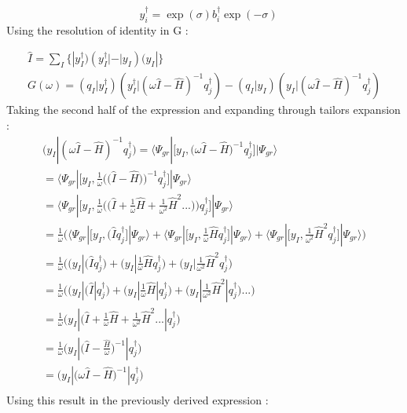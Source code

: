 \documentclass[11pt, oneside]{article}   	%
\begin{document}
\begin{equation*}\label{eq:unitary transformed excitation}
  \begin{aligned}
  \end{aligned}
    y_i^\dagger=\exp(\sigma) b_i^\dagger \exp(- \sigma)
\end{equation*}
Using the resolution of identity in G :

\begin{equation*}\label{eq:resolution of identity}
  \begin{aligned}
    \hat I=\sum_I \{ |y_I^\dagger)(y_I^\dagger|-|y_I)(y_I|\}\\
    G(\omega)=(q_I|y_I^\dagger)(y_I^\dagger|(\omega \hat I - \hat H)^{-1}q_j^\dagger) - (q_I|y_I)(y_I|(\omega \hat I - \hat H)^{-1}q_j^\dagger)
  \end{aligned}
\end{equation*}
Taking the second half of the expression and expanding through tailors expansion :
\begin{equation*}\label{eq:resolution of identity}
  \begin{aligned}
    (y_I|(\omega \hat I - \hat H)^{-1}q_j^\dagger) =\big \langle \Psi_{gr} |\big[ y_I , \big(\omega \hat I-\hat H \big)^{-1} q_j^\dagger \big] | \Psi_{gr}\big \rangle \\ 
     =\big \langle \Psi_{gr} |\big[ y_I , \frac{1}{ \omega} \Bigg( \big( \hat I-\hat H \big)\Bigg)^{-1} q_j^\dagger \big] | \Psi_{gr}\big \rangle \\ 
     =\big \langle \Psi_{gr} |\big[ y_I , \frac{1}{\omega} \Bigg( \big( \hat I+ \frac{1}{ \omega} \hat H + \frac{1}{\omega^2}\hat H^2 ...\big)\Bigg) q_j^\dagger \big] | \Psi_{gr}\big \rangle \\ 
     =\frac{1}{\omega }\Bigg(\big \langle \Psi_{gr} |\big[ y_I , \big( \hat I q_j^\dagger \big] | \Psi_{gr}\big \rangle +\big \langle \Psi_{gr} |\big[ y_I , \frac{1}{\omega}\hat H  q_j^\dagger \big] | \Psi_{gr}\big \rangle  +\big \langle \Psi_{gr} |\big[ y_I ,\frac{1}{\omega^2} \hat H^2  q_j^\dagger \big] | \Psi_{gr}\big \rangle \Bigg)\\ 
     =\frac{1}{\omega} \Bigg(\big( y_I | \big( \hat I q_j^\dagger \big) +\big( y_I | \frac{1}{\omega}\hat H  q_j^\dagger \big) +\big( y_I |\frac{1}{\omega^2} \hat H^2  q_j^\dagger \big)\\ 
     =\frac{1}{\omega} \Bigg(\big( y_I | \big( \hat I| q_j^\dagger \big) +\big( y_I | \frac{1}{\omega}\hat H | q_j^\dagger \big) +\big( y_I |\frac{1}{\omega^2} \hat H^2|  q_j^\dagger \big)...\Bigg)\\ 
     =\frac{1}{\omega} \big( y_I | \big( \hat I + \frac{1}{\omega}\hat H + \frac{1}{\omega^2} \hat H^2 ...|  q_j^\dagger \big)\\ 
     =\frac{1}{\omega} \big( y_I | \big( \hat I - \frac{\hat H}{\omega}\big)^{-1}|  q_j^\dagger \big)\\ 
     = \big( y_I | \big( \omega\hat I - \hat H\big)^{-1}|  q_j^\dagger \big)\\ 
  \end{aligned}
\end{equation*}
Using this result in the previously derived expression :
\end{document}
